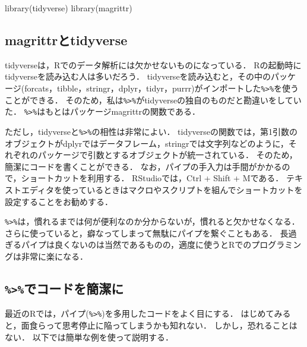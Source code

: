 \documentclass[
]{article}
\newenvironment{Shaded}{\begin{snugshade}}{\end{snugshade}}
\newcommand{\FunctionTok}[1]{\textcolor[rgb]{0.00,0.00,0.00}{#1}}
\newcommand{\NormalTok}[1]{#1}
\begin{document}
\begin{Shaded}
\begin{Highlighting}[]
\FunctionTok{library}\NormalTok{(tidyverse)}
\FunctionTok{library}\NormalTok{(magrittr)}
\end{Highlighting}
\end{Shaded}

\hypertarget{magrittrux3068tidyverse}{%
\subsection{magrittrとtidyverse}\label{magrittrux3068tidyverse}}

tidyverseは，Rでのデータ解析には欠かせないものになっている．
Rの起動時にtidyverseを読み込む人は多いだろう．
tidyverseを読み込むと，その中のパッケージ(forcats，tibble，stringr，dplyr，tidyr，purrr)がインポートした\texttt{\%\textgreater{}\%}を使うことができる．
そのため，私は\texttt{\%\textgreater{}\%}がtidyverseの独自のものだと勘違いをしていた．
\texttt{\%\textgreater{}\%}はもとはパッケージmagrittrの関数である．

ただし，tidyverseと\texttt{\%\textgreater{}\%}の相性は非常によい．
tidyverseの関数では，第1引数のオブジェクトがdplyrではデータフレーム，stringrでは文字列などのように，それぞれのパッケージで引数とするオブジェクトが統一されている．
そのため，簡潔にコードを書くことができる．
なお，パイプの手入力は手間がかかるので，ショートカットを利用する．
RStudioでは，Ctrl + Shift + Mである．
テキストエディタを使っているときはマクロやスクリプトを組んでショートカットを設定することをお勧めする．

\texttt{\%\textgreater{}\%}は，慣れるまでは何が便利なのか分からないが，慣れると欠かせなくなる．
さらに使っていると，癖なってしまって無駄にパイプを繋ぐこともある．
長過ぎるパイプは良くないのは当然であるものの，適度に使うとRでのプログラミングは非常に楽になる．

\hypertarget{ux3067ux30b3ux30fcux30c9ux3092ux7c21ux6f54ux306b}{%
\subsection{\texorpdfstring{\texttt{\%\textgreater{}\%}でコードを簡潔に}{\%\textgreater\%でコードを簡潔に}}\label{ux3067ux30b3ux30fcux30c9ux3092ux7c21ux6f54ux306b}}

最近のRでは，パイプ(\texttt{\%\textgreater{}\%})を多用したコードをよく目にする．
はじめてみると，面食らって思考停止に陥ってしまうかも知れない．
しかし，恐れることはない．
以下では簡単な例を使って説明する．
\end{document}
